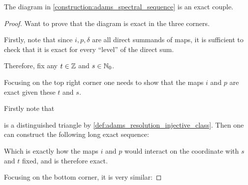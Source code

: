 \begin{theorem}
    The diagram in \autoref{construction:adams_spectral_sequence} is an exact couple.
\end{theorem}
\begin{proof}
    Want to prove that the diagram is exact in the three corners.

    Firstly, note that since \( i, p, \delta \) are all direct summands of maps, it is sufficient to check that it is exact for every ``level'' of the direct sum.

    Therefore, fix any \( t \in {\mathbb{Z}} \) and \( s \in {\mathbb{N}}_0 \).

    Focusing on the top right corner one needs to show that the maps \( i \) and \( p \) are exact given these \( t \) and \( s \).

    Firstly note that
    \begin{center}
    \end{center}
    is a distinguished triangle by \autoref{def:adams_resolution_injective_class}. Then one can construct the following long exact sequence:
    \begin{center}
    \end{center}

    Which is exactly how the maps \( i \) and \( p \) would interact on the coordinate with \( s \) and \( t \) fixed, and is therefore exact.

    Focusing on the bottom corner, it is very similar:


\end{proof}
